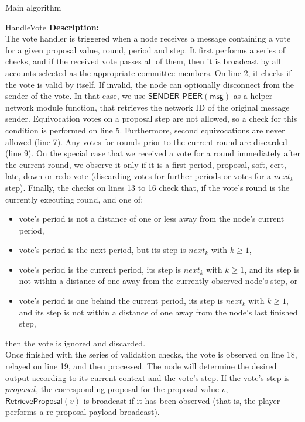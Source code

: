 \documentclass[10pt,a4paper]{article}
\begin{document}
\begin{section}{Main algorithm}
\begin{subsection}{HandleVote}
\noindent \textbf{Description:}\\
The vote handler is triggered when a node receives a message containing a vote for a given proposal value, round, period and step.
It first performs a series of checks, and if the received vote passes all of them, then it is broadcast by all accounts selected
as the appropriate committee members.
On line 2, it checks if the vote is valid by itself. If invalid, the node can optionally disconnect 
from the sender of the vote. In that case, we use $\mathsf{SENDER\_PEER(msg)}$ as a helper network module function,
that retrieves the network ID of the original message sender.
Equivocation votes on a proposal step are not allowed, so a check for this condition is performed on line 5.
Furthermore, second equivocations are never allowed (line 7).
Any votes for rounds prior to the current round are discarded (line 9).
On the special case that we received a vote for a round immediately after the current round, we observe it only if it is a first period,
proposal, soft, cert, late, down or redo vote (discarding votes for further periods or votes for a $next_k$ step).
Finally, the checks on lines 13 to 16 check that, if the vote's round is the currently executing round, and one of:
\begin{itemize}
    \item vote's period is not a distance of one or less away from the node's current period,
    \item vote's period is the next period, but its step is $next_{k}$ with $k \geq 1$,
    \item vote's period is the current period, its step is $next_{k}$ with $k \geq 1$, 
and its step is not within a distance of one away from the currently observed node's step, or
    \item vote's period is one behind the current period, its step is $next_{k}$ with $k \geq 1$, and
its step is not within a distance of one away from the node's last finished step,
\end{itemize}
then the vote is ignored and discarded. \\
Once finished with the series of validation checks, the vote is observed on line 18, relayed on line 19, and then processed.
The node will determine the desired output according to its current context and the vote's step.
If the vote's step is $proposal$, the corresponding proposal for the proposal-value $v$, $\mathsf{RetrieveProposal}(v)$ is broadcast if it has been observed 
(that is, the player performs a re-proposal payload broadcast).

\end{subsection}
\end{section}
\end{document}
